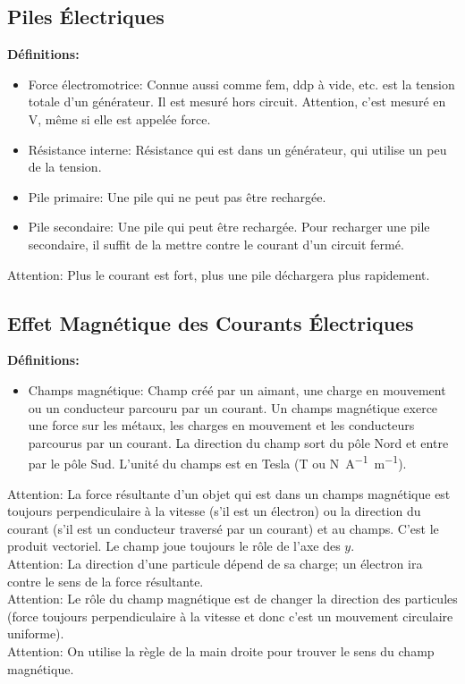 \documentclass[french, a4paper, 12pt]{article}
\begin{document}
\subsection{Piles Électriques}
\textbf{Définitions:}
\begin{itemize}
\item Force électromotrice: Connue aussi comme fem, ddp à vide, etc. est la tension totale d'un générateur. Il est mesuré hors circuit. Attention, c'est mesuré en \si{\volt}, même si elle est appelée force.
\item Résistance interne: Résistance qui est dans un générateur, qui utilise un peu de la tension.
\item Pile primaire: Une pile qui ne peut pas être rechargée.
\item Pile secondaire: Une pile qui peut être rechargée. Pour recharger une pile secondaire, il suffit de la mettre contre le courant d'un circuit fermé.
\end{itemize}
Attention: Plus le courant est fort, plus une pile déchargera plus rapidement.

\subsection{Effet Magnétique des Courants Électriques}
\textbf{Définitions:}
\begin{itemize}
\item Champs magnétique: Champ créé par un aimant, une charge en mouvement ou un conducteur parcouru par un courant. Un champs magnétique exerce une force sur les métaux, les charges en mouvement et les conducteurs parcourus par un courant. La direction du champ sort du pôle Nord et entre par le pôle Sud. L'unité du champs est en Tesla (\si{T} ou \si{N.A^{-1}.m^{-1}}). 
\end{itemize}
Attention: La force résultante d'un objet qui est dans un champs magnétique est toujours perpendiculaire à la vitesse (s'il est un électron) ou la direction du courant (s'il est un conducteur traversé par un courant) et au champs. C'est le produit vectoriel. Le champ joue toujours le rôle de l'axe des $y$.\\
Attention: La direction d'une particule dépend de sa charge; un électron ira contre le sens de la force résultante.\\
Attention: Le rôle du champ magnétique est de changer la direction des particules (force toujours perpendiculaire à la vitesse et donc c'est un mouvement circulaire uniforme).\\
Attention: On utilise la règle de la main droite pour trouver le sens du champ magnétique.
\pagebreak
\end{document}
